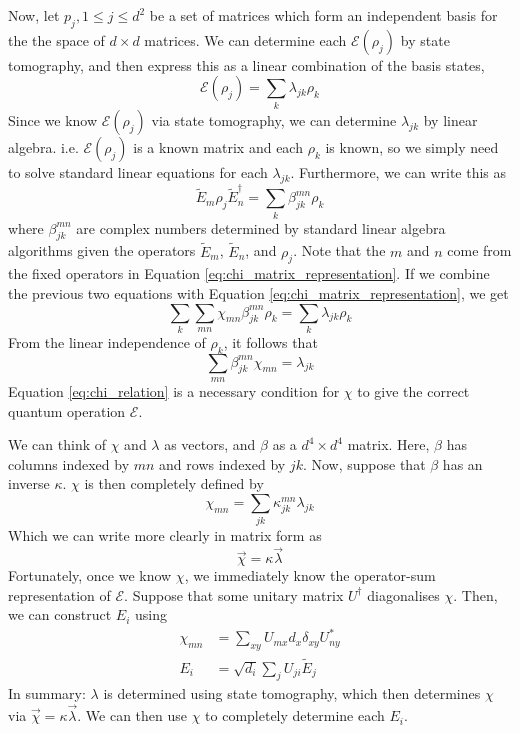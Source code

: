 Now, let $p_j, 1 \le j \le d^2$ be a set of matrices which form an independent basis for the the
space of $d \times d$ matrices. We can determine each $\mathcal{E}(\rho_j)$ by state tomography, and
then express this as a linear combination of the basis states,
\begin{equation}
    \mathcal{E}(\rho_j) = \sum_k \lambda_{jk} \rho_k
\end{equation}
Since we know $\mathcal{E}(\rho_j)$ via state tomography, we can determine $\lambda_{jk}$ by linear
algebra. i.e. $\mathcal{E}(\rho_j)$ is a known matrix and each $\rho_k$ is known, so we simply need
to solve standard linear equations for each $\lambda_{jk}$. Furthermore, we can write this as
\begin{equation}
    \tilde{E}_m \rho_j \tilde{E}_n^{\dagger} = \sum_k \beta_{jk}^{mn} \rho_k
\end{equation}
where $\beta_{jk}^{mn}$ are complex numbers determined by standard linear algebra algorithms given
the operators $\tilde{E}_m$, $\tilde{E}_n$, and $\rho_j$. Note that the $m$ and $n$ come from the fixed operators in
Equation \ref{eq:chi_matrix_representation}. If we combine the previous two equations with Equation
\ref{eq:chi_matrix_representation}, we get
\begin{equation}
    \sum_k \sum_{mn} \chi_{mn} \beta_{jk}^{mn} \rho_k = \sum_k \lambda_{jk} \rho_k
\end{equation}
From the linear independence of $\rho_k$, it follows that
\begin{equation} \label{eq:chi_relation}
    \sum_{mn} \beta_{jk}^{mn} \chi_{mn} = \lambda_{jk}
\end{equation}
Equation \ref{eq:chi_relation} is a necessary condition for $\chi$ to give the correct quantum
operation $\mathcal{E}$.

We can think of $\chi$ and $\lambda$ as vectors, and $\beta$ as a $d^4 \times d^4$ matrix. Here,
$\beta$ has columns indexed by $mn$ and rows indexed by $jk$. Now, suppose that $\beta$ has an
inverse $\kappa$. $\chi$ is then completely defined by
\begin{equation}
    \chi_{mn} = \sum_{jk} \kappa_{jk}^{mn} \lambda_{jk}
\end{equation}
Which we can write more clearly in matrix form as
\begin{equation}
    \vec{\chi} = \kappa \vec{\lambda}
\end{equation}
Fortunately, once we know $\chi$, we immediately know the operator-sum representation of
$\mathcal{E}$. Suppose that some unitary matrix $U^{\dagger}$ diagonalises $\chi$. Then, we can
construct $E_i$ using
\begin{align}
    \chi_{mn} &= \sum_{xy} U_{mx} d_x \delta_{xy} U^*_{ny} \\
    E_i &= \sqrt{d_i} \sum_j U_{ji} \tilde{E}_j
\end{align}
In summary: $\lambda$ is determined using state tomography, which then determines $\chi$ via
$\vec{\chi} = \kappa \vec{\lambda}$. We can then use $\chi$ to completely determine each $E_i$.

